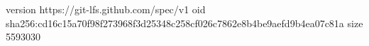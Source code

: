 version https://git-lfs.github.com/spec/v1
oid sha256:cd16c15a70f98f273968f3d25348c258cf026c7862e8b4be9aefd9b4ea07c81a
size 5593030
